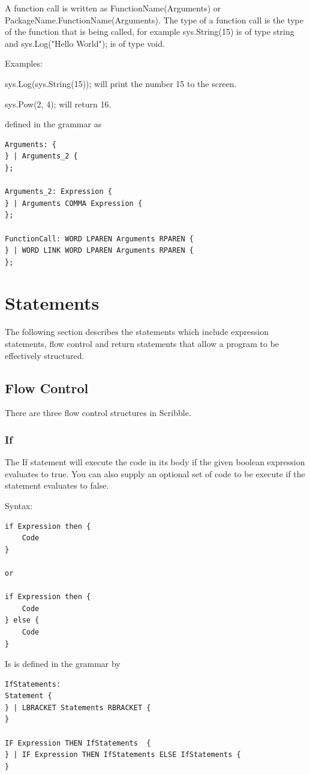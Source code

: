 \documentclass[]{final_report}
\begin{document}
A function call is written as FunctionName(Arguments) or PackageName.FunctionName(Arguments). The type of a function call is the type of the function that is being called, for example sys.String(15) is of type string and sys.Log("Hello World"); is of type void.

Examples:

sys.Log(sys.String(15)); will print the number 15 to the screen.

sys.Pow(2, 4); will return 16.

defined in the grammar as
\begin{verbatim}
Arguments: {
} | Arguments_2 {
};

Arguments_2: Expression {
} | Arguments COMMA Expression {
};

FunctionCall: WORD LPAREN Arguments RPAREN {
} | WORD LINK WORD LPAREN Arguments RPAREN {
};
\end{verbatim}

\section{Statements}

The following section describes the statements which include expression statements, flow control and return statements that allow a program to be effectively structured.

\subsection{Flow Control}

There are three flow control structures in Scribble.

\subsubsection{If}

The If statement will execute the code in its body if the given boolean expression evaluates to true. You can also supply an optional set of code to be execute if the statement evaluates to false.

Syntax: 
\begin{verbatim}
if Expression then {
	Code
}

or

if Expression then {
	Code
} else {
	Code
}
\end{verbatim}

Is is defined in the grammar by
\begin{verbatim}
IfStatements: 
Statement {
} | LBRACKET Statements RBRACKET {
}

IF Expression THEN IfStatements  {
} | IF Expression THEN IfStatements ELSE IfStatements {
}
\end{verbatim}
\end{document}
